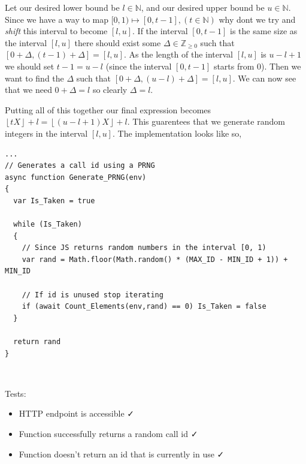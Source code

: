 Let our desired lower bound be $l \in \mathbb{N}$, and our desired upper
bound be $u \in \mathbb{N}$. Since we have a way to map $[0, 1) \mapsto
[0, t-1], (t \in \mathbb{N})$ why dont we try and \textit{shift}
this interval to become $[l, u]$. If the interval $[0, t-1]$ is the
same size as the interval $[l, u]$ there should exist some $\Delta \in \mathbb{Z}_{\geq 0}$
such that $[0 + \Delta, (t-1) + \Delta] = [l, u]$. As the length of the
interval $[l, u]$ is $u - l + 1$ we should set $t-1 = u - l$
(since the interval $[0, t-1]$ starts from 0). Then we want to find
the $\Delta$ such that $[0 + \Delta, (u - l) + \Delta] = [l, u]$.
We can now see that we need $0 + \Delta = l$ so clearly
$\Delta = l$. \\ \vspace{0.2cm}

Putting all of this together our final expression becomes
$\left \lfloor tX \right \rfloor +l = \left \lfloor (u - l + 1)X \right \rfloor + l$.
This guarentees that we generate random integers
in the interval $[l, u]$. The implementation looks like so,

\begin{verbatim}
...
// Generates a call id using a PRNG
async function Generate_PRNG(env)
{
  var Is_Taken = true

  while (Is_Taken)
  {
    // Since JS returns random numbers in the interval [0, 1)
    var rand = Math.floor(Math.random() * (MAX_ID - MIN_ID + 1)) + MIN_ID

    // If id is unused stop iterating
    if (await Count_Elements(env,rand) == 0) Is_Taken = false
  }

  return rand
}
\end{verbatim}

{\color{gray} \hrulefill} \\ \vspace{0.2cm}

{\sffamily Tests:}

\begin{itemize}
  \item HTTP endpoint is accessible \faCheck \\
  \item Function successfully returns a random call id \faCheck \\
  \item Function doesn't return an id that is currently in use \faCheck \\
\end{itemize}

